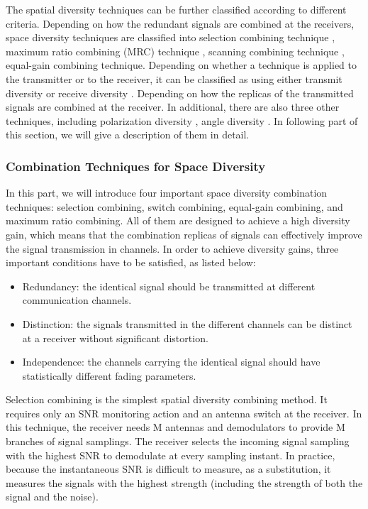 The spatial diversity techniques can be further classified according
to different criteria. Depending on how the redundant signals are
combined at the receivers, space diversity techniques are classified
into selection combining technique \cite{24}, maximum ratio
combining (MRC) technique \cite{11}, scanning combining technique
\cite{25}, equal-gain combining technique\cite{25}. Depending on
whether a technique is applied to the transmitter or to the
receiver, it can be classified as using either transmit diversity or
receive diversity \cite{29}. Depending on how the replicas of the
transmitted signals are combined at the receiver. In additional,
there are also three other techniques, including polarization
diversity \cite{27}, angle diversity \cite{28}. In following part of
this section, we will give a description of them in detail.

\subsubsection{Combination Techniques for Space Diversity}
In this part, we will introduce four important space diversity
combination techniques:  selection combining, switch combining,
equal-gain combining, and maximum ratio combining. All of them are
designed to achieve a high diversity gain, which means that the
combination replicas of signals can effectively improve the signal
transmission in channels. In order to achieve diversity gains, three
important conditions have to be satisfied, as listed below:
\begin{itemize}
\item
Redundancy: the identical signal should be transmitted at different
communication channels.
\item
Distinction: the signals transmitted in the different channels can
be distinct at a receiver without significant distortion.
\item
Independence: the channels carrying the identical signal should have
statistically different fading parameters.
\end{itemize}

Selection combining is the simplest spatial diversity combining
method. It requires only an SNR monitoring action and an antenna
switch at the receiver. In this technique, the receiver needs M
antennas and demodulators to provide M branches of signal samplings.
The receiver selects the incoming signal sampling with the highest
SNR to demodulate at every sampling instant. In practice, because
the instantaneous SNR is difficult to measure, as a substitution, it
measures the signals with the highest strength (including the
strength of both the signal and the noise).

